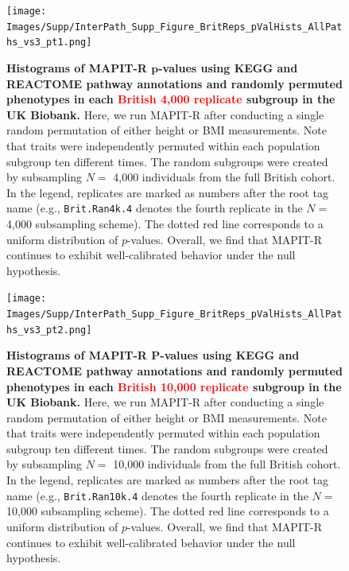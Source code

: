 \documentclass[10pt]{article}
\begin{document}
\begin{figure}[htbp]
\centering
\texttt{[image: Images/Supp/InterPath\_Supp\_Figure\_BritReps\_pValHists\_AllPaths\_vs3\_pt1.png]}
\caption{\textbf{Histograms of MAPIT-R $\bm{p}$-values using KEGG and REACTOME pathway annotations and randomly permuted phenotypes in each \textcolor{red}{British 4,000 replicate} subgroup in the UK Biobank.} Here, we run MAPIT-R after conducting a single random permutation of either height or BMI measurements. Note that traits were independently permuted within each population subgroup ten different times. The random subgroups were created by subsampling $N =$ 4,000 individuals from the full British cohort. In the legend, replicates are marked as numbers after the root tag name (e.g., \texttt{Brit.Ran4k.4} denotes the fourth replicate in the $N =$ 4,000 subsampling scheme). The dotted red line corresponds to a uniform distribution of $p$-values. Overall, we find that MAPIT-R continues to exhibit well-calibrated behavior under the null hypothesis.}
\label{InterPath-Supp-Figure-BritReps-10perms-pValHists-pt1}
\end{figure}
\clearpage


\begin{figure}[htbp]
\centering
\texttt{[image: Images/Supp/InterPath\_Supp\_Figure\_BritReps\_pValHists\_AllPaths\_vs3\_pt2.png]}
\caption{\textbf{Histograms of MAPIT-R $\bm{P}$-values using KEGG and REACTOME pathway annotations and randomly permuted phenotypes in each \textcolor{red}{British 10,000 replicate} subgroup in the UK Biobank.} Here, we run MAPIT-R after conducting a single random permutation of either height or BMI measurements. Note that traits were independently permuted within each population subgroup ten different times. The random subgroups were created by subsampling $N =$ 10,000 individuals from the full British cohort. In the legend, replicates are marked as numbers after the root tag name (e.g., \texttt{Brit.Ran10k.4} denotes the fourth replicate in the $N =$ 10,000 subsampling scheme). The dotted red line corresponds to a uniform distribution of $p$-values. Overall, we find that MAPIT-R continues to exhibit well-calibrated behavior under the null hypothesis.}
\label{InterPath-Supp-Figure-BritReps-10perms-pValHists-pt2}
\end{figure}
\clearpage
\end{document}
